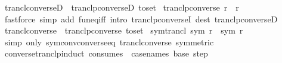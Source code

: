 \begin{isabellebody}
%
\isadelimproof
\isanewline
%
\endisadelimproof
\isanewline
{}\isamarkupfalse%
\ trancl{\isacharunderscore}{\kern0pt}converseD\ {\isacharequal}{\kern0pt}\ tranclp{\isacharunderscore}{\kern0pt}converseD\ {\isacharbrackleft}{\kern0pt}to{\isacharunderscore}{\kern0pt}set{\isacharbrackright}{\kern0pt}\isanewline
\isanewline
{}\isamarkupfalse%
\ tranclp{\isacharunderscore}{\kern0pt}converse{\isacharcolon}{\kern0pt}\ {\isachardoublequoteopen}{\isacharparenleft}{\kern0pt}r{\isasyminverse}{\isasyminverse}{\isacharparenright}{\kern0pt}\isactrlsup {\isacharplus}{\kern0pt}\isactrlsup {\isacharplus}{\kern0pt}\ {\isacharequal}{\kern0pt}\ {\isacharparenleft}{\kern0pt}r\isactrlsup {\isacharplus}{\kern0pt}\isactrlsup {\isacharplus}{\kern0pt}{\isacharparenright}{\kern0pt}{\isasyminverse}{\isasyminverse}{\isachardoublequoteclose}\isanewline
%
\isadelimproof
\ \ %
\endisadelimproof
%
\isatagproof
{}\isamarkupfalse%
\ {\isacharparenleft}{\kern0pt}fastforce\ simp\ add{\isacharcolon}{\kern0pt}\ fun{\isacharunderscore}{\kern0pt}eq{\isacharunderscore}{\kern0pt}iff\ intro{\isacharbang}{\kern0pt}{\isacharcolon}{\kern0pt}\ tranclp{\isacharunderscore}{\kern0pt}converseI\ dest{\isacharbang}{\kern0pt}{\isacharcolon}{\kern0pt}\ tranclp{\isacharunderscore}{\kern0pt}converseD{\isacharparenright}{\kern0pt}%
\endisatagproof
{\isafoldproof}%
%
\isadelimproof
\isanewline
%
\endisadelimproof
\isanewline
{}\isamarkupfalse%
\ trancl{\isacharunderscore}{\kern0pt}converse\ {\isacharequal}{\kern0pt}\ tranclp{\isacharunderscore}{\kern0pt}converse\ {\isacharbrackleft}{\kern0pt}to{\isacharunderscore}{\kern0pt}set{\isacharbrackright}{\kern0pt}\isanewline
\isanewline
{}\isamarkupfalse%
\ sym{\isacharunderscore}{\kern0pt}trancl{\isacharcolon}{\kern0pt}\ {\isachardoublequoteopen}sym\ r\ {\isasymLongrightarrow}\ sym\ {\isacharparenleft}{\kern0pt}r\isactrlsup {\isacharplus}{\kern0pt}{\isacharparenright}{\kern0pt}{\isachardoublequoteclose}\isanewline
%
\isadelimproof
\ \ %
\endisadelimproof
%
\isatagproof
{}\isamarkupfalse%
\ {\isacharparenleft}{\kern0pt}simp\ only{\isacharcolon}{\kern0pt}\ sym{\isacharunderscore}{\kern0pt}conv{\isacharunderscore}{\kern0pt}converse{\isacharunderscore}{\kern0pt}eq\ trancl{\isacharunderscore}{\kern0pt}converse\ {\isacharbrackleft}{\kern0pt}symmetric{\isacharbrackright}{\kern0pt}{\isacharparenright}{\kern0pt}%
\endisatagproof
{\isafoldproof}%
%
\isadelimproof
\isanewline
%
\endisadelimproof
\isanewline
{}\isamarkupfalse%
\ converse{\isacharunderscore}{\kern0pt}tranclp{\isacharunderscore}{\kern0pt}induct\ {\isacharbrackleft}{\kern0pt}consumes\ {}{\isacharcomma}{\kern0pt}\ case{\isacharunderscore}{\kern0pt}names\ base\ step{\isacharbrackright}{\kern0pt}{\isacharcolon}{\kern0pt}\isanewline

\end{isabellebody}
